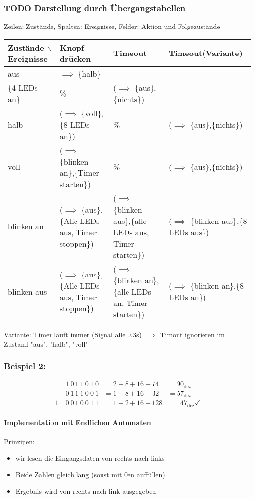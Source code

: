 \documentclass[a4paper]{scrartcl}
\begin{document}
\subsubsection{{\bfseries\sffamily TODO} Darstellung durch Übergangstabellen}
\label{sec-3-3-2}
Zeilen: Zustände, Spalten: Ereignisse, Felder: Aktion und Folgezustände
\begin{center}
\begin{tabular}{llll}
Zustände $\backslash$ Ereignisse & Knopf drücken & Timeout & Timeout(Variante)\\
\hline
aus & $\implies$ \{halb\} \\ \{4 LEDs an\} & \% & ($\implies$ \{aus\},\{nichts\})\\
halb & ($\implies$ \{voll\},\{8 LEDs an\}) & \% & ($\implies$ \{aus\},\{nichts\})\\
voll & ($\implies$ \{blinken an\},\{Timer starten\}) & \% & ($\implies$ \{aus\},\{nichts\})\\
blinken an & ($\implies$ \{aus\},\{Alle LEDs aus, Timer stoppen\}) & ($\implies$ \{blinken aus\},\{alle LEDs aus, Timer starten\}) & ($\implies$ \{blinken aus\},\{8 LEDs aus\})\\
blinken aus & ($\implies$ \{aus\},\{Alle LEDs aus, Timer stoppen\}) & ($\implies$ \{blinken an\},\{alle LEDs an, Timer starten\}) & ($\implies$ \{blinken an\},\{8 LEDs an\})\\
\end{tabular}
\end{center}

Variante: Timer läuft immer (Signal alle 0.3s) $\implies$ Timout ignorieren im Zustand "aus", "halb", "voll"
\subsubsection{Beispiel 2:}
\label{sec-3-3-3}
\begin{align}
&1~0~1~1~0~1~0 &= 2 + 8 + 16 + 74 &= 90_{\text{dez}} \\
+&0~1~1~1~0~0~1 &= 1 + 8 + 16 + 32 &= 57_{\text{dez}} \\
\hline
1~&0~0~1~0~0~1~1 &= 1 + 2 + 16 + 128 &= 147_{\text{dez}}\checkmark
\end{align}
\paragraph{Implementation mit Endlichen Automaten}
\label{sec-3-3-3-1}
Prinzipen:
\begin{itemize}
\item wir lesen die Eingangsdaten von rechts nach links
\item Beide Zahlen gleich lang (sonst mit 0en auffüllen)
\item Ergebnis wird von rechts nach link ausgegeben
\end{itemize}
\end{document}

